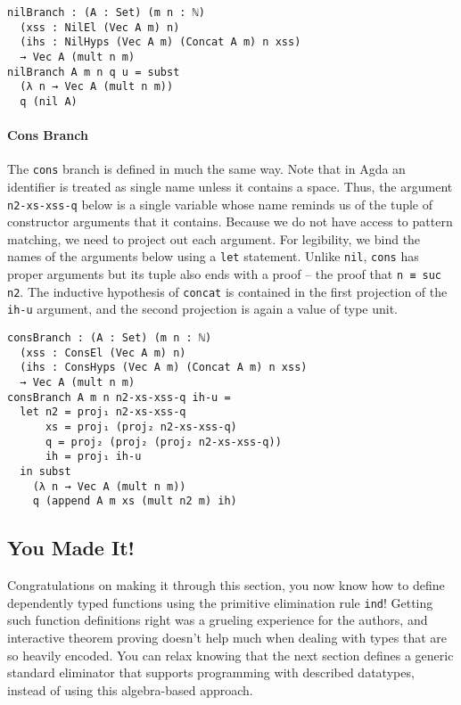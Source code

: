 \documentclass[preprint,nonatbib]{sigplanconf}
\begin{document}
\begin{verbatim}
nilBranch : (A : Set) (m n : ℕ)
  (xss : NilEl (Vec A m) n)
  (ihs : NilHyps (Vec A m) (Concat A m) n xss)
  → Vec A (mult n m)
nilBranch A m n q u = subst
  (λ n → Vec A (mult n m))
  q (nil A)
\end{verbatim}

\paragraph{Cons Branch}

The {\tt cons} branch is defined in much the same way. Note
that in {\sc Agda} an identifier is treated as single name unless it
contains a space. Thus, the argument {\tt n2-xs-xss-q} below is a
single variable whose name reminds us of the tuple of constructor
arguments that it contains. Because we do not have access to pattern
matching, we need to project out each argument. For legibility, we
bind the names of the arguments below using a {\tt let} statement.
Unlike {\tt nil}, {\tt cons} has proper arguments but its tuple also
ends with a proof -- the proof that {\tt n ≡ suc n2}. The inductive
hypothesis of {\tt concat} is contained in the first projection of the
{\tt ih-u} argument, and the second projection is again a value of
type unit.

\begin{verbatim}
consBranch : (A : Set) (m n : ℕ)
  (xss : ConsEl (Vec A m) n)
  (ihs : ConsHyps (Vec A m) (Concat A m) n xss)
  → Vec A (mult n m)
consBranch A m n n2-xs-xss-q ih-u =
  let n2 = proj₁ n2-xs-xss-q
      xs = proj₁ (proj₂ n2-xs-xss-q)
      q = proj₂ (proj₂ (proj₂ n2-xs-xss-q))
      ih = proj₁ ih-u
  in subst
    (λ n → Vec A (mult n m))
    q (append A m xs (mult n2 m) ih)
\end{verbatim}

\subsection{You Made It!}

Congratulations on making it through this section, you now know how to define dependently typed
functions using the primitive elimination rule {\tt ind}!
Getting such function definitions right was a grueling experience for
the authors, and interactive theorem proving doesn't help much when
dealing with types that are so heavily encoded. You can relax knowing
that the next section defines a generic standard eliminator that supports
programming with described datatypes, instead of using this
algebra-based approach.
\end{document}
